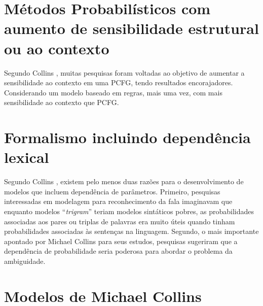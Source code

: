 \section{Métodos Probabilísticos com aumento de sensibilidade estrutural ou ao contexto}
\label{sec:aumento_sensibilidade}

Segundo Collins \cite{collins99}, muitas pesquisas foram voltadas ao objetivo de aumentar a sensibilidade ao contexto em uma PCFG, tendo resultados encorajadores. Considerando um modelo baseado em regras, mais uma vez, com mais sensibilidade ao contexto que PCFG. 

\section{Formalismo incluindo dependência lexical}
\label{sec:dependencia_lexical}

Segundo Collins \cite{collins99}, existem pelo menos duas razões para o desenvolvimento de modelos que incluem dependência de parâmetros. Primeiro, pesquisas interessadas em modelagem para reconhecimento da fala imaginavam que enquanto modelos ``\emph{trigram}'' teriam modelos sintáticos pobres, as probabilidades associadas aos pares ou triplas de palavras era muito úteis quando tinham probabilidades associadas às sentenças na linguagem. Segundo, o mais importante apontado por Michael Collins para seus estudos, pesquisas sugeriram que a dependência de probabilidade seria poderosa para abordar o problema da ambiguidade.

\section{Modelos de Michael Collins}
\label{sec:modelos_collins}


